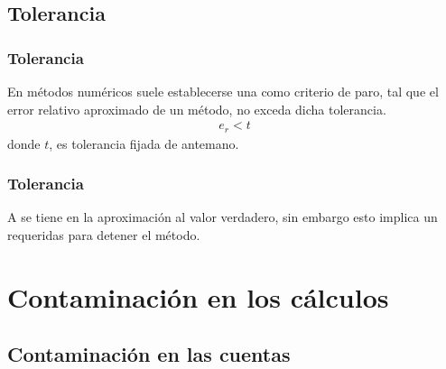 \documentclass[12pt]{beamer}
\begin{document}

\subsection{Tolerancia}

\begin{frame}
\frametitle{Tolerancia}
En métodos numéricos suele establecerse una  como criterio de paro, \pause tal
que el error relativo aproximado de un método, no exceda dicha tolerancia.
\begin{align*}
e_{r} < t
\end{align*}
donde $t$, es tolerancia fijada de antemano.
\end{frame}
\begin{frame}
\frametitle{Tolerancia}
A  se tiene  en la aproximación al valor verdadero, \pause sin embargo esto implica un  requeridas para detener el método.
\end{frame}

\section{Contaminación en los cálculos}
\subsection{Contaminación en las cuentas}
\end{document}
